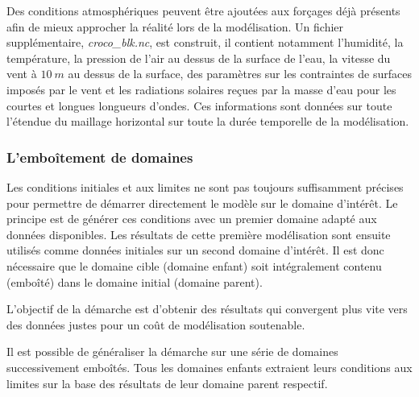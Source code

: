 \documentclass[10pt,a4paper,titlepage]{article}
\begin{document}
Des conditions atmosphériques peuvent être ajoutées aux forçages déjà présents afin de mieux approcher la réalité lors de la modélisation.
Un fichier supplémentaire, \textit{croco\_blk.nc}, est construit, il contient notamment l'humidité, la température, la pression de l'air au dessus de la surface de l'eau, la vitesse du vent à $10~m$ au dessus de la surface, des paramètres sur les contraintes de surfaces imposés par le vent et les radiations solaires reçues par la masse d'eau pour les courtes et longues longueurs d'ondes.
Ces informations sont données sur toute l'étendue du maillage horizontal sur toute la durée temporelle de la modélisation.

\subsubsection{L'emboîtement de domaines}
\label{subsub:emboitement_domaines}

Les conditions initiales et aux limites ne sont pas toujours suffisamment précises pour permettre de démarrer directement le modèle sur le domaine d'intérêt.
Le principe est de générer ces conditions avec un premier domaine adapté aux données disponibles.
Les résultats de cette première modélisation sont ensuite utilisés comme données initiales sur un second domaine d'intérêt.
Il est donc nécessaire que le domaine cible (domaine enfant) soit intégralement contenu (emboîté) dans le domaine initial (domaine parent).

L'objectif de la démarche est d'obtenir des résultats qui convergent plus vite vers des données justes pour un coût de modélisation soutenable.

Il est possible de généraliser la démarche sur une série de domaines successivement emboîtés.
Tous les domaines enfants extraient leurs conditions aux limites sur la base des résultats de leur domaine parent respectif.
\end{document}
